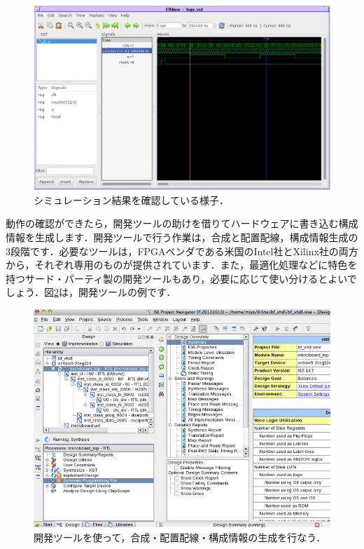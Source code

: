 \documentclass[a4paper,dvipdfmx]{jsarticle}
\begin{document}
 \begin{figure}[H]
  \begin{center}
   \includegraphics[width=.8\textwidth]{chapter01_figures/simulation_example.pdf}
  \end{center}
  \caption{シミュレーション結果を確認している様子．\label{fig:simulation_image}}
 \end{figure}


動作の確認ができたら，開発ツールの助けを借りてハードウェアに書き込む構成情報を生成します．開発ツールで行う作業は，合成と配置配線，構成情報生成の3段階です．必要なツールは，FPGAベンダである米国のIntel社とXilinx社の両方から，それぞれ専用のものが提供されています．また，最適化処理などに特色を持つサード・パーティ製の開発ツールもあり，必要に応じて使い分けるとよいでしょう．図\ref{fig:fpga_devtool_image}は，開発ツールの例です．

 \begin{figure}[H]
  \begin{center}
   \includegraphics[width=.8\textwidth]{chapter01_figures/fpga_devtool_image.png}
  \end{center}
  \caption{開発ツールを使って，合成・配置配線・構成情報の生成を行なう．\label{fig:fpga_devtool_image}}
 \end{figure}
\end{document}
